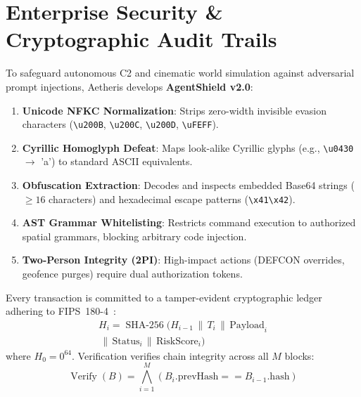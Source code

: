 \documentclass[10pt,twocolumn,letterpaper]{article}
\begin{document}
\section{Enterprise Security \& Cryptographic Audit Trails}

To safeguard autonomous C2 and cinematic world simulation against adversarial prompt injections, Aetheris develops \textbf{AgentShield v2.0}:
\begin{enumerate}
    \item \textbf{Unicode NFKC Normalization}: Strips zero-width invisible evasion characters (\texttt{\textbackslash u200B}, \texttt{\textbackslash u200C}, \texttt{\textbackslash u200D}, \texttt{\textbackslash uFEFF}).
    \item \textbf{Cyrillic Homoglyph Defeat}: Maps look-alike Cyrillic glyphs (e.g., \texttt{\textbackslash u0430} $\to$ 'a') to standard ASCII equivalents.
    \item \textbf{Obfuscation Extraction}: Decodes and inspects embedded Base64 strings ($\ge 16$ characters) and hexadecimal escape patterns (\texttt{\textbackslash x41\textbackslash x42}).
    \item \textbf{AST Grammar Whitelisting}: Restricts command execution to authorized spatial grammars, blocking arbitrary code injection.
    \item \textbf{Two-Person Integrity (2PI)}: High-impact actions (DEFCON overrides, geofence purges) require dual authorization tokens.
\end{enumerate}

Every transaction is committed to a tamper-evident cryptographic ledger adhering to FIPS~180-4~\cite{nist2015sha}:
\begin{multline}
H_i = \operatorname{SHA-256}\big( H_{i-1} \,\|\, T_i \,\|\, \text{Payload}_i \\
\,\|\, \text{Status}_i \,\|\, \text{RiskScore}_i \big)
\end{multline}
where $H_0 = 0^{64}$. Verification verifies chain integrity across all $M$ blocks:
\begin{equation}
\operatorname{Verify}(B) = \bigwedge_{i=1}^M \left( B_i.\text{prevHash} == B_{i-1}.\text{hash} \right)
\end{equation}

\end{document}
